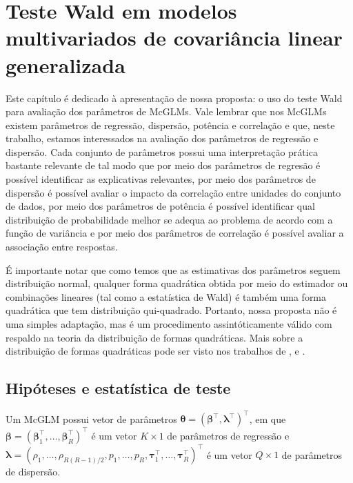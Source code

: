 
\chapter{Teste Wald em modelos multivariados de covariância linear generalizada}\label{cap:proposta}

Este capítulo é dedicado à apresentação de nossa proposta: o uso do teste Wald para avaliação dos parâmetros de McGLMs. Vale lembrar que nos McGLMs existem parâmetros de regressão, dispersão, potência e correlação e que, neste trabalho, estamos interessados na avaliação dos parâmetros de regressão e dispersão. Cada conjunto de parâmetros possui uma interpretação prática bastante relevante de tal modo que por meio dos parâmetros de regresão é possível identificar as explicativas relevantes, por meio dos parâmetros de dispersão é possível avaliar o impacto da correlação entre unidades do conjunto de dados, por meio dos parâmetros de potência é possível identificar qual distribuição de probabilidade melhor se adequa ao problema de acordo com a função de variância e por meio dos parâmetros de correlação é possível avaliar a associação entre respostas.

É importante notar que como temos que as estimativas dos parâmetros seguem distribuição normal, qualquer forma quadrática obtida por meio do estimador ou combinações lineares (tal como a estatística de Wald) é também uma forma quadrática que tem distribuição qui-quadrado. Portanto, nossa proposta não é uma simples adaptação, mas é um procedimento assintóticamente válido com respaldo na teoria da distribuição de formas quadráticas. Mais sobre a distribuição de formas quadráticas pode ser visto nos trabalhos de \citet{graybill1957idempotent}, \citet{luther1965decomposition} e \citet{baldessari1967distribution}.


\section{Hipóteses e estatística de teste}

Um McGLM possui vetor de parâmetros $\boldsymbol{\theta} = (\boldsymbol{\beta}^{\top}, \boldsymbol{\lambda}^{\top})^{\top}$, em que $\boldsymbol{\beta} = (\boldsymbol{\beta}_1^\top, \ldots, \boldsymbol{\beta}_R^\top)^\top$ é um vetor $K \times 1$ de parâmetros de regressão e $\boldsymbol{\lambda} = (\rho_1, \ldots, \rho_{R(R-1)/2}, p_1, \ldots, p_R, \boldsymbol{\tau}_1^\top, \ldots, \boldsymbol{\tau}_R^\top)^\top$ é um vetor $Q \times 1$ de parâmetros de dispersão.

